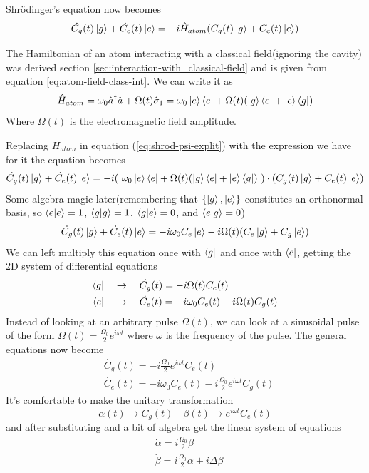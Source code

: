 \documentclass[english, a4paper, 12pt, twoside]{article}
\numberwithin{equation}{section} %
\begin{document}
Shr\"{o}dinger's equation now becomes
\begin{equation} \label{eq:shrod-psi-explit}
     \dot{C_g}(t) \ket{g} + \dot{C_e}(t) \ket{e} = -i \hat{H}_{atom} (C_g(t) \ket{g} + C_e(t) \ket{e})
\end{equation}

The Hamiltonian of an atom interacting with a classical field(ignoring the cavity) was derived section \ref{sec:interaction-with_classical-field} and is given from equation \ref{eq:atom-field-class-int}. We can write it as
\[
    \hat{H}_{atom} = \omega_0 \hat{a}^\dag \hat{a} + \Omega(t)\hat{\sigma}_1= \omega_0\ket{e}\bra{e} + \Omega(t)(\ket{g}\bra{e} + \ket{e}\bra{g})
\]
Where $\Omega(t)$ is the electromagnetic field amplitude.

Replacing $H_{atom}$ in equation (\ref{eq:shrod-psi-explit}) with the expression we have for it the equation becomes
\[
    \dot{C_g}(t) \ket{g} + \dot{C_e}(t) \ket{e} = -i (\ \omega_0\ket{e}\bra{e} + \Omega(t)(\ket{g}\bra{e} + \ket{e}\bra{g})\ )\cdot (C_g(t) \ket{g} + C_e(t) \ket{e})
\]
Some algebra magic later(remembering that $\{\ket{g},\ket{e}\}$ constitutes an orthonormal basis, so $\braket{e}{e} = 1$, $\braket{g}{g} = 1$, $\braket{g}{e} = 0$, and $\braket{e}{g} = 0$)
\[
    \dot{C_g}(t) \ket{g} + \dot{C_e}(t) \ket{e} = -i \omega_0 C_e \ket{e} - i\Omega(t)(C_e\ket{g} + C_g \ket{e})
\]
We can left multiply this equation once with $\bra{g}$ and once with $\bra{e}$, getting the 2D system of differential equations
\begin{align*}
    \bra{g} \quad &\rightarrow \quad \dot{C_g}(t) = -i \Omega(t)C_e(t) \\
    \bra{e} \quad &\rightarrow \quad \dot{C_e}(t) = -i \omega_0 C_e(t) - i\Omega(t) C_g(t)
\end{align*} 
Instead of looking at an arbitrary pulse $\Omega (t)$, we can look at a sinusoidal pulse of the form $\Omega (t) = \frac{\Omega_0}{2}e^{i\omega t}$ where $\omega$ is the frequency of the pulse. The general equations now become
\begin{align*}
    &\dot{C_g}(t) = -i \frac{\Omega_0}{2}e^{i\omega t}C_e(t) \\
    &\dot{C_e}(t) = -i \omega_0 C_e(t) - i \frac{\Omega_0}{2}e^{i\omega t} C_g(t)
\end{align*}
It's comfortable to make the unitary transformation
\[
    \alpha(t) \rightarrow C_g(t) \quad \beta(t) \rightarrow e^{i \omega t} C_e(t)
\]
and after substituting and a bit of algebra get the linear system of equations
\begin{align*}
    &\dot{\alpha} = i \frac{\Omega_0}{2} \beta \\
    &\dot{\beta} = i \frac{\Omega_0}{2} \alpha + i \Delta \beta
\end{align*}
\end{document}
